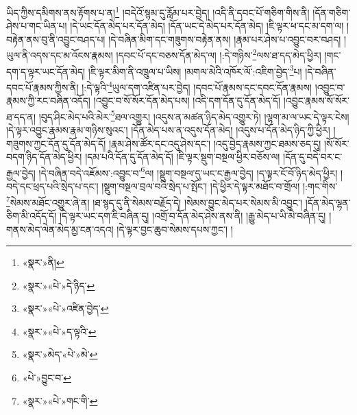 ཡིད་ཀྱིས་དམིགས་ནས་རྟོགས་པ་ན།\footnote{«སྣར་»ནི།} །བདེའོ་སྙམ་དུ་རློམ་པར་བྱེད། །འདི་ནི་དབང་པོ་གཅིག་གིས་ནི། །དོན་གཅིག་ཤེས་པ་གང་ཡིན་པ། །དེ་ཡང་དོན་མེད་པར་དོན་མེད། །དོན་ཡང་དེ་མེད་པར་དོན་མེད། །ཇི་ལྟར་ཕ་དང་མ་དག་ལ། །བརྟེན་ནས་བུ་ནི་འབྱུང་བཤད་པ། །དེ་བཞིན་མིག་དང་གཟུགས་བརྟེན་ནས། །རྣམ་པར་ཤེས་པ་འབྱུང་བར་བཤད། །ཡུལ་ནི་འདས་དང་མ་འོངས་རྣམས། །དབང་པོ་དང་བཅས་དོན་མེད་ལ། །:དེ་གཉིས་\footnote{«སྣར་»«པེ་»དེ་ཉིད་}ལས་ཐ་དད་མེད་ཕྱིར། །གང་དག་ད་ལྟར་ཡང་དོན་མེད། །ཇི་ལྟར་མིག་ནི་འཁྲུལ་པ་ཡིས། །མགལ་མེའི་འཁོར་ལོ་:འཇིག་བྱེད་\footnote{«སྣར་»«པེ་»འཛིན་བྱེད་}པ། །དེ་བཞིན་དབང་པོ་རྣམས་ཀྱིས་ནི། །:དེ་ལྟའི་\footnote{«སྣར་»«པེ་»ད་ལྟའི་}ཡུལ་དག་འཛིན་པར་བྱེད། །དབང་པོ་རྣམས་དང་དབང་དོན་རྣམས། །འབྱུང་བ་རྣམས་ཀྱི་རང་བཞིན་འདོད། །འབྱུང་བ་སོ་སོར་དོན་མེད་པས། །འདི་དག་དོན་དུ་དོན་མེད་དོ། །འབྱུང་རྣམས་སོ་སོར་ཐ་དད་ན། །བུད་ཤིང་མེད་པའི་མེར་\footnote{«སྣར་»མེད་«པེ་»མེ་}ཐལ་འགྱུར། །འདུས་ན་མཚན་ཉིད་མེད་འགྱུར་ཏེ། །ལྷག་མ་ལ་ཡང་དེ་ལྟར་ངེས། །དེ་ལྟར་འབྱུང་རྣམས་རྣམ་གཉིས་སུའང་། །དོན་མེད་པས་ན་འདུས་དོན་མེད། །འདུས་པ་དོན་མེད་ཉིད་ཀྱི་ཕྱིར། །གཟུགས་ཀྱང་དོན་དུ་དོན་མེད་དོ། །རྣམ་ཤེས་ཚོར་དང་འདུ་ཤེས་དང་། །འདུ་བྱེད་རྣམས་ཀྱང་ཐམས་ཅད་དུ། །སོ་སོར་བདག་ཉིད་དོན་མེད་ཕྱིར། །དམ་པའི་དོན་དུ་དོན་མེད་དོ། །ཇི་ལྟར་སྡུག་བསྔལ་ཕྱིར་བཅོས་ལ། །དོན་དུ་བདེ་བར་ང་རྒྱལ་བྱེད། །དེ་བཞིན་བདེ་འཇོམས་:འབྱུང་བ་\footnote{«པེ་»བྱུང་བ་}ལ། །སྡུག་བསྔལ་དུ་ཡང་ང་རྒྱལ་བྱེད། །ད་ལྟར་ངོ་བོ་ཉིད་མེད་ཕྱིར། །བདེ་དང་ཕྲད་པའི་སྲེད་པ་དང་། །སྡུག་བསྔལ་བྲལ་བའི་སྲེད་པ་སྤོང་། །དེ་ཕྱིར་དེ་ལྟར་མཐོང་བ་གྲོལ། །:གང་གིས་\footnote{«སྣར་»«པེ་»གང་གི་}སེམས་མཐོང་འགྱུར་ཞེ་ན། །ཐ་སྙད་དུ་ནི་སེམས་བརྗོད་དེ། །སེམས་བྱུང་མེད་པར་སེམས་མི་འབྱུང་། །དོན་མེད་ལྷན་ཅིག་མི་འདོད་དོ། །དེ་ལྟར་ཡང་དག་ཇི་བཞིན་དུ། །འགྲོ་བ་དོན་མེད་ཤེས་ནས་ནི། །རྒྱུ་མེད་པ་ཡི་མེ་བཞིན་དུ། །གནས་མེད་ལེན་མེད་མྱ་ངན་འདའ། །དེ་ལྟར་བྱང་ཆུབ་སེམས་དཔས་ཀྱང་། །
